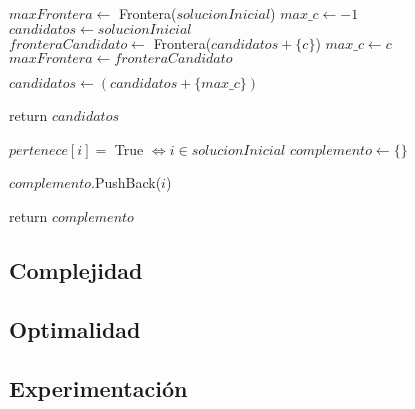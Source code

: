 
\begin{algorithm}[H]
\begin{algorithmic}

    \State $maxFrontera \gets$ Frontera($solucionInicial$)
    \State $max\_c \gets -1$
    \State $candidatos \gets solucionInicial$  \\

            \State $fronteraCandidato \gets$ Frontera($candidatos + \{c\}$)
                \State $max\_c \gets c$
                \State $maxFrontera \gets fronteraCandidato$ \\
            \EndIf
        \EndIf
    \EndFor

        \State $candidatos \gets (candidatos + \{max\_c\})$
    \EndIf

    \State return $candidatos$

\EndFunction
\end{algorithmic}
\end{algorithm}



\begin{algorithm}[H]
\begin{algorithmic}
    \State $pertenece[i] =$ True $\iff i \in solucionInicial$
    \State $complemento \gets \{\}$

    \For{$i \in [0..n)$}
            \State $complemento$.PushBack($i$)
        \EndIf
    \EndFor

    \State return $complemento$

\EndFunction
\end{algorithmic}
\end{algorithm}


\subsection{Complejidad}

\subsection{Optimalidad}

\subsection{Experimentación}